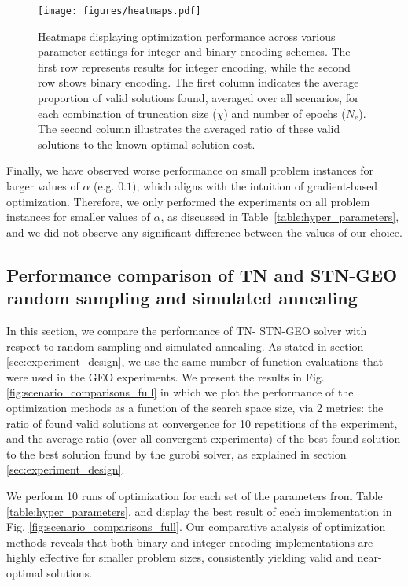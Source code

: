 \begin{figure*}[ht]
   \centering
   \texttt{[image: figures/heatmaps.pdf]}
    \caption{Heatmaps displaying optimization performance across various parameter settings for integer and binary encoding schemes. The first row represents results for integer encoding, while the second row shows binary encoding. The first column indicates the average proportion of valid solutions found, averaged over all scenarios, for each combination of truncation size ($\chi$) and number of epochs ($N_e$). The second column illustrates the averaged ratio of these valid solutions to the known optimal solution cost.}
    \label{fig:heatmaps}
\end{figure*}

Finally, we have observed worse performance on small problem instances for larger values of $\alpha$ (e.g. $0.1$), which aligns with the intuition of gradient-based optimization. Therefore, we only performed the experiments on all problem instances for smaller values of $\alpha$, as discussed in Table~\ref{table:hyper_parameters}, and we did not observe any significant difference between the values of our choice. 

\subsection{Performance comparison of TN and STN-GEO random sampling and simulated annealing}
In this section, we compare the performance of TN- STN-GEO solver with respect to random sampling and simulated annealing. As stated in section \ref{sec:experiment_design}, we use the same number of function evaluations that were used in the GEO experiments. We present the results in Fig. \ref{fig:scenario_comparisons_full} in which we plot the performance of the optimization methods as a function of the search space size, via 2 metrics: the ratio of found valid solutions at convergence for 10 repetitions of the experiment, and the average ratio (over all convergent experiments) of the best found solution to the best solution found by the gurobi solver, as explained in section \ref{sec:experiment_design}.

We perform 10 runs of optimization for each set of the parameters from Table \ref{table:hyper_parameters}, and display the best result of each implementation in Fig. \ref{fig:scenario_comparisons_full}. Our comparative analysis of optimization methods reveals that both binary and integer encoding implementations are highly effective for smaller problem sizes, consistently yielding valid and near-optimal solutions. 

